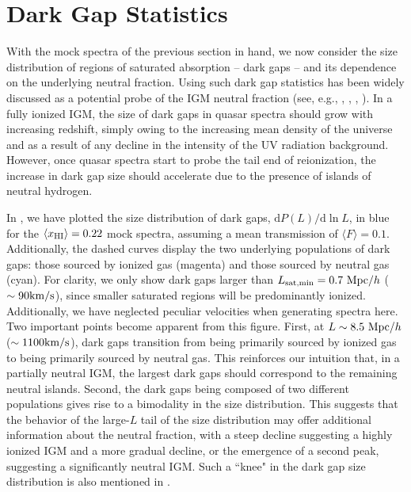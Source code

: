 \section{Dark Gap Statistics} \label{sec:HIDistributions}


With the mock spectra of the previous section in hand, we now consider the size distribution of regions of saturated absorption -- dark gaps -- and its dependence on the underlying neutral fraction. Using such dark gap statistics has been widely discussed as a potential probe of the IGM neutral fraction (see, e.g., \citealt{Fan:2005es}, \citealt{Gallerani:2005mf}, \citealt{2010MNRAS.407.1328M}, \citealt{McGreer:2011dm}). In a fully ionized IGM, the size of dark gaps in quasar spectra should grow with increasing redshift, simply owing to the increasing mean density of the universe and as a result of any decline in the intensity of the UV radiation background. However, once quasar spectra start to probe the tail end of reionization, the increase in dark gap size should accelerate due to the presence of islands of neutral hydrogen. 

In , we have plotted the size distribution of dark gaps, $\text{d}P(L)/\text{d}\ln L$, in blue for the $\langle x_{\text{HI}}\rangle = 0.22$ mock spectra, assuming a mean transmission of $\langle F \rangle = 0.1$. Additionally, the dashed curves display the two underlying populations of dark gaps: those sourced by ionized gas (magenta) and those sourced by neutral gas (cyan). For clarity, we only show dark gaps larger than $L_{\text{sat,min}} = 0.7\ \text{Mpc/$h$}$ ($\sim 90 \text{km}/\text{s}$), since smaller saturated regions will be predominantly ionized. Additionally, we have neglected peculiar velocities when generating spectra here. Two important points become apparent from this figure. First, at $ L \sim 8.5\ \text{Mpc/$h$}$ ($\sim 1100 \text{km}/\text{s}$), dark gaps transition from being primarily sourced by ionized gas to being primarily sourced by neutral gas. This reinforces our intuition that, in a partially neutral IGM, the largest dark gaps should correspond to the remaining neutral islands. Second, the dark gaps being composed of two different populations gives rise to a bimodality in the size distribution. This suggests that the behavior of the large-$L$ tail of the size distribution may offer additional information about the neutral fraction, with a steep decline suggesting a highly ionized IGM and a more gradual decline, or the emergence of a second peak, suggesting a significantly neutral IGM. Such a ``knee" in the dark gap size distribution is also mentioned in \cite{2010MNRAS.407.1328M}.


